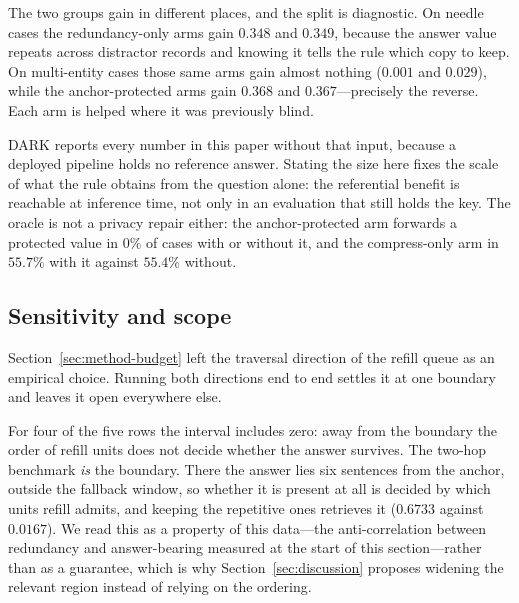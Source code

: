 The two groups gain in different places, and the split is diagnostic. On needle cases the
redundancy-only arms gain $0.348$ and $0.349$, because the answer value repeats across
distractor records and knowing it tells the rule which copy to keep. On multi-entity cases
those same arms gain almost nothing ($0.001$ and $0.029$), while the anchor-protected arms
gain $0.368$ and $0.367$---precisely the reverse. Each arm is helped where it was previously
blind.

\textsc{DARK} reports every number in this paper without that input, because a deployed
pipeline holds no reference answer. Stating the size here fixes the scale of what the rule
obtains from the question alone: the referential benefit is reachable at inference time, not
only in an evaluation that still holds the key. The oracle is not a privacy repair either:
the anchor-protected arm forwards a protected value in $0\%$ of cases with or without it, and
the compress-only arm in $55.7\%$ with it against $55.4\%$ without.

\subsection{Sensitivity and scope}
Section~\ref{sec:method-budget} left the traversal direction of the refill queue as an
empirical choice. Running both directions end to end settles it at one boundary and leaves it
open everywhere else.

\begin{center}\small
\setlength{\tabcolsep}{4pt}
\end{center}

For four of the five rows the interval includes zero: away from the boundary the order of
refill units does not decide whether the answer survives. The two-hop benchmark \emph{is} the
boundary. There the answer lies six sentences from the anchor, outside the fallback window,
so whether it is present at all is decided by which units refill admits, and keeping the
repetitive ones retrieves it ($0.6733$ against $0.0167$). We read this as a property of this
data---the anti-correlation between redundancy and answer-bearing measured at the start of
this section---rather than as a guarantee, which is why
Section~\ref{sec:discussion} proposes widening the relevant region instead of relying on the
ordering.

